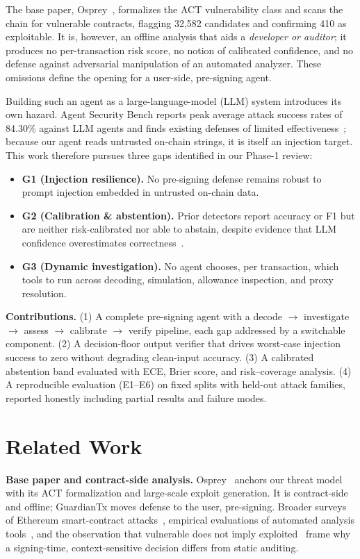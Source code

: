 \documentclass[conference]{IEEEtran}
\begin{document}
The base paper, Osprey~\cite{ruaro2025approve}, formalizes the ACT vulnerability
class and scans the chain for vulnerable contracts, flagging 32{,}582 candidates
and confirming 410 as exploitable. It is, however, an offline analysis that aids a
\emph{developer or auditor}; it produces no per-transaction risk score, no notion
of calibrated confidence, and no defense against adversarial manipulation of an
automated analyzer. These omissions define the opening for a user-side, pre-signing
agent.

Building such an agent as a large-language-model (LLM) system introduces its own
hazard. Agent Security Bench reports peak average attack success rates of
84.30\% against LLM agents and finds existing defenses of limited
effectiveness~\cite{zhang2025asb}; because our agent reads untrusted on-chain
strings, it is itself an injection target. This work therefore pursues three gaps
identified in our Phase-1 review:
\begin{itemize}
\item \textbf{G1 (Injection resilience).} No pre-signing defense remains robust to
prompt injection embedded in untrusted on-chain data.
\item \textbf{G2 (Calibration \& abstention).} Prior detectors report accuracy or
F1 but are neither risk-calibrated nor able to abstain, despite evidence that LLM
confidence overestimates correctness~\cite{jung2025trust}.
\item \textbf{G3 (Dynamic investigation).} No agent chooses, per transaction, which
tools to run across decoding, simulation, allowance inspection, and proxy
resolution.
\end{itemize}

\noindent\textbf{Contributions.} (1) A complete pre-signing agent with a decode
$\rightarrow$ investigate $\rightarrow$ assess $\rightarrow$ calibrate $\rightarrow$
verify pipeline, each gap addressed by a switchable component. (2) A
decision-floor output verifier that drives worst-case injection success to zero
without degrading clean-input accuracy. (3) A calibrated abstention band evaluated
with ECE, Brier score, and risk--coverage analysis. (4) A reproducible evaluation
(E1--E6) on fixed splits with held-out attack families, reported honestly including
partial results and failure modes.

\section{Related Work}
\textbf{Base paper and contract-side analysis.} Osprey~\cite{ruaro2025approve}
anchors our threat model with its ACT formalization and large-scale exploit
generation. It is contract-side and offline; GuardianTx moves defense to the user,
pre-signing. Broader surveys of Ethereum smart-contract
attacks~\cite{atzei2017survey}, empirical evaluations of automated analysis
tools~\cite{durieux2020empirical}, and the observation that vulnerable does not imply
exploited~\cite{perez2021vulnerable} frame why a signing-time, context-sensitive
decision differs from static auditing.
\end{document}
